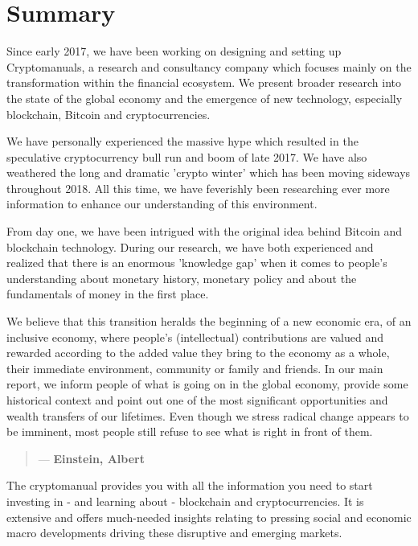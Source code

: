 \chapter{Summary}
Since early 2017, we have been working on designing and setting up Cryptomanuals, a research and consultancy company which focuses mainly on the transformation within the financial ecosystem.  We present broader research into the state of the global economy and the emergence of new technology, especially blockchain, Bitcoin and cryptocurrencies.\medskip

We have personally experienced the massive hype which resulted in the speculative cryptocurrency bull run and boom of late 2017. We have also weathered the long and dramatic 'crypto winter' which has been moving sideways throughout 2018. All this time, we have feverishly been researching ever more information to enhance our understanding of this environment.\medskip 

From day one, we have been intrigued with the original idea behind Bitcoin and blockchain technology. During our research, we have both experienced and realized that there is an enormous 'knowledge gap' when it comes to people's understanding about monetary history, monetary policy and about the fundamentals of money in the first place.\medskip

We believe that this transition heralds the beginning of a new economic era, of an inclusive economy, where people's (intellectual) contributions are valued and rewarded according to the added value they bring to the economy as a whole, their immediate environment, community or family and friends. In our main report, we inform people of what is going on in the global economy, provide some historical context and point out one of the most significant opportunities and wealth transfers of our lifetimes. Even though we stress radical change appears to be imminent, most people still refuse to see what is right in front of them. 

\begin{quotation}

  \textit{}
  \begin{flushright}
    \small{--- \textbf{Einstein, Albert}}
  \end{flushright}

\end{quotation}

The cryptomanual provides you with all the information you need to start investing in - and learning about - blockchain and cryptocurrencies. It is extensive and offers much-needed insights relating to pressing social and economic macro developments driving these disruptive and emerging markets.\medskip 

